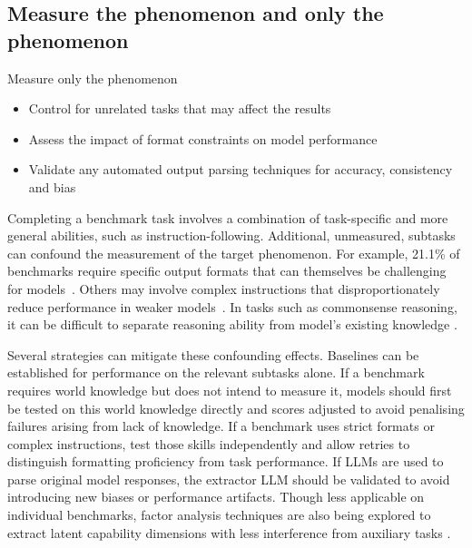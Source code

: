 \subsection{Measure the phenomenon and only the phenomenon}

\begin{checklistbox}{Measure only the phenomenon}
    \begin{itemize}[leftmargin=5pt, label=\scriptsize$\square$]
\item Control for unrelated tasks that may affect the results
\item Assess the impact of format constraints on model performance
\item Validate any automated output parsing techniques for accuracy, consistency and bias
\end{itemize}
\end{checklistbox}


Completing a benchmark task involves a combination of task-specific and more general abilities, such as instruction-following. Additional, unmeasured, subtasks can confound the measurement of the target phenomenon. For example, 21.1\% of benchmarks require specific output formats that can themselves be challenging for models~\cite{tamLetMeSpeak2024a}. Others may involve complex instructions that disproportionately reduce performance in weaker models~\cite{beanLINGOLYBenchmarkOlympiadlevel2024a}. In tasks such as commonsense reasoning, it can be difficult to separate reasoning ability from model's existing knowledge \cite{hoWikiWhyAnsweringExplaining2023}.

Several strategies can mitigate these confounding effects. Baselines can be established for performance on the relevant subtasks alone. If a benchmark requires world knowledge but does not intend to measure it, models should first be tested on this world knowledge directly and scores adjusted to avoid penalising failures arising from lack of knowledge. If a benchmark uses strict formats or complex instructions, test those skills independently and allow retries to distinguish formatting proficiency from task performance. If LLMs are used to parse original model responses, the extractor LLM should be validated to avoid introducing new biases or performance artifacts. Though less applicable on individual benchmarks, factor analysis techniques are also being explored to extract latent capability dimensions with less interference from auxiliary tasks \cite{ruan2024observational, ilic2024evidence, burnell2023revealing}.


